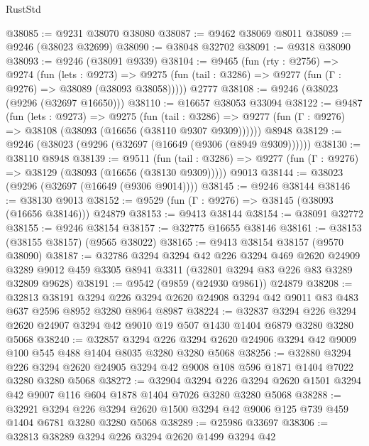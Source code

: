 \begin{lexlean}{RustStd}
\begin{coremodule}
@38085 := @9231 @38070 @38080
@38087 := @9462 @38069 @8011
@38089 := @9246 (@38023 @32699)
@38090 := @38048 @32702
@38091 := @9318 @38090
@38093 := @9246 (@38091 @9339)
@38104 := @9465
    (fun (rty : @2756) =>
    @9274
      (fun (lets : @9273) =>
      @9275 (fun (tail : @3286) => @9277 (fun (Γ : @9276) => @38089 (@38093 @38058)))))
    @2777
@38108 := @9246 (@38023 (@9296 (@32697 @16650)))
@38110 := @16657 @38053 @33094
@38122 := @9487
    (fun (lets : @9273) =>
    @9275
      (fun (tail : @3286) =>
      @9277 (fun (Γ : @9276) => @38108 (@38093 (@16656 (@38110 @9307 @9309))))))
    @8948
@38129 := @9246 (@38023 (@9296 (@32697 (@16649 (@9306 (@8949 @9309))))))
@38130 := @38110 @8948
@38139 := @9511
    (fun (tail : @3286) => @9277 (fun (Γ : @9276) => @38129 (@38093 (@16656 (@38130 @9309)))))
    @9013
@38144 := @38023 (@9296 (@32697 (@16649 (@9306 @9014))))
@38145 := @9246 @38144
@38146 := @38130 @9013
@38152 := @9529 (fun (Γ : @9276) => @38145 (@38093 (@16656 @38146))) @24879
@38153 := @9413 @38144
@38154 := @38091 @32772
@38155 := @9246 @38154
@38157 := @32775 @16655 @38146
@38161 := @38153 (@38155 @38157) (@9565 @38022)
@38165 := @9413 @38154 @38157 (@9570 @38090)
@38187 := @32786
    @3294
    @3294
    @42
    @226
    @3294
    @469
    @2620
    @24909
    @3289
    @9012
    @459
    @3305
    @8941
    @3311
    (@32801 @3294 @83 @226 @83 @3289 @32809 @9628)
@38191 := @9542 (@9859 (@24930 @9861)) @24879
@38208 := @32813
    @38191
    @3294
    @226
    @3294
    @2620
    @24908
    @3294
    @42
    @9011
    @83
    @483
    @637
    @2596
    @8952
    @3280
    @8964
    @8987
@38224 := @32837
    @3294
    @226
    @3294
    @2620
    @24907
    @3294
    @42
    @9010
    @19
    @507
    @1430
    @1404
    @6879
    @3280
    @3280
    @5068
@38240 := @32857
    @3294
    @226
    @3294
    @2620
    @24906
    @3294
    @42
    @9009
    @100
    @545
    @488
    @1404
    @8035
    @3280
    @3280
    @5068
@38256 := @32880
    @3294
    @226
    @3294
    @2620
    @24905
    @3294
    @42
    @9008
    @108
    @596
    @1871
    @1404
    @7022
    @3280
    @3280
    @5068
@38272 := @32904
    @3294
    @226
    @3294
    @2620
    @1501
    @3294
    @42
    @9007
    @116
    @604
    @1878
    @1404
    @7026
    @3280
    @3280
    @5068
@38288 := @32921
    @3294
    @226
    @3294
    @2620
    @1500
    @3294
    @42
    @9006
    @125
    @739
    @459
    @1404
    @6781
    @3280
    @3280
    @5068
@38289 := @25986 @33697
@38306 := @32813
    @38289
    @3294
    @226
    @3294
    @2620
    @1499
    @3294
    @42

\end{coremodule}
\end{lexlean}
